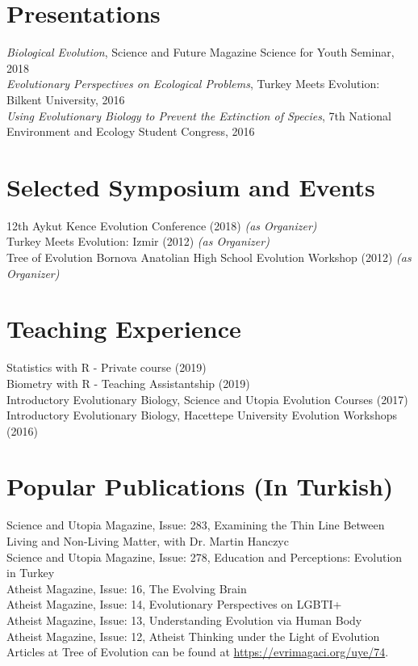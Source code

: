 \documentclass[letterpaper,11pt]{article}
\begin{document}
\section{Presentations}
{\textit{Biological Evolution}}, Science and Future Magazine Science for Youth Seminar, 2018 \\
{\textit{Evolutionary Perspectives on Ecological Problems}}, Turkey Meets Evolution: Bilkent University, 2016 \\
{\textit{Using Evolutionary Biology to Prevent the Extinction of
Species}}, 7th National Environment and Ecology Student Congress, 2016

\section{Selected Symposium and Events}
12th Aykut Kence Evolution Conference (2018) \textit{(as Organizer)} \\
Turkey Meets Evolution: Izmir (2012) \textit{(as Organizer)} \\
Tree of Evolution Bornova Anatolian High School Evolution Workshop (2012) \textit{(as Organizer)} \\

\section{Teaching Experience}
Statistics with R - Private course (2019) \\
Biometry with R - Teaching Assistantship (2019) \\
Introductory Evolutionary Biology, Science and Utopia Evolution Courses (2017) \\
Introductory Evolutionary Biology, Hacettepe University Evolution Workshops (2016) \\


\section{Popular Publications (In Turkish)}
Science and Utopia Magazine, Issue: 283, Examining the Thin Line Between Living and Non-Living Matter, with Dr. Martin Hanczyc \\
Science and Utopia Magazine, Issue: 278, Education and Perceptions: Evolution in Turkey \\
Atheist Magazine, Issue: 16, The Evolving Brain \\
Atheist Magazine, Issue: 14, Evolutionary Perspectives on LGBTI+ \\
Atheist Magazine, Issue: 13, Understanding Evolution via Human Body \\
Atheist Magazine, Issue: 12, Atheist Thinking under the Light of Evolution \\
Articles at Tree of Evolution can be found at \href{https://evrimagaci.org/uye/74}{https://evrimagaci.org/uye/74}. 
\end{document}
